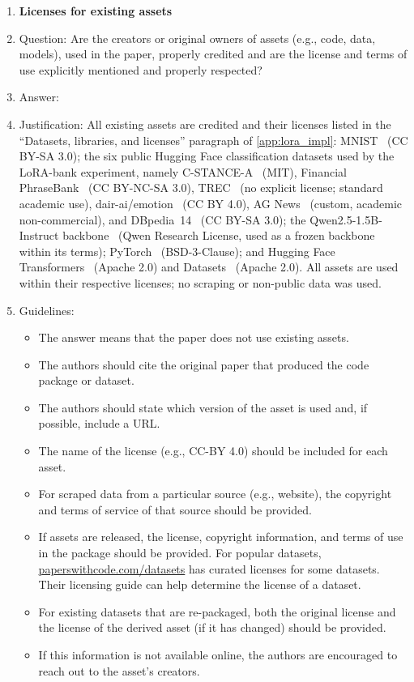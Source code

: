 \begin{enumerate}
\item {\bf Licenses for existing assets}
    \item[] Question: Are the creators or original owners of assets (e.g., code, data, models), used in the paper, properly credited and are the license and terms of use explicitly mentioned and properly respected?
    \item[] Answer: \answerYes{}
    \item[] Justification: All existing assets are credited and their licenses listed in the ``Datasets, libraries, and licenses'' paragraph of \cref{app:lora_impl}: MNIST~\citep{lecun1998mnist} (CC BY-SA 3.0); the six public Hugging Face classification datasets used by the LoRA-bank experiment, namely C-STANCE-A~\citep{zhao2024cstance} (MIT), Financial PhraseBank~\citep{malo2014finphrasebank} (CC BY-NC-SA 3.0), TREC~\citep{li2002trec} (no explicit license; standard academic use), dair-ai/emotion~\citep{saravia2018emotion} (CC BY 4.0), AG News~\citep{zhang2015charcnn} (custom, academic non-commercial), and DBpedia~14~\citep{zhang2015charcnn} (CC BY-SA 3.0); the Qwen2.5-1.5B-Instruct backbone~\citep{qwen2_5_2024} (Qwen Research License, used as a frozen backbone within its terms); PyTorch~\citep{paszke2019pytorch} (BSD-3-Clause); and Hugging Face Transformers~\citep{wolf2020transformers} (Apache 2.0) and Datasets~\citep{lhoest2021datasets} (Apache 2.0). All assets are used within their respective licenses; no scraping or non-public data was used.
    \item[] Guidelines:
    \begin{itemize}
        \item The answer \answerNA{} means that the paper does not use existing assets.
        \item The authors should cite the original paper that produced the code package or dataset.
        \item The authors should state which version of the asset is used and, if possible, include a URL.
        \item The name of the license (e.g., CC-BY 4.0) should be included for each asset.
        \item For scraped data from a particular source (e.g., website), the copyright and terms of service of that source should be provided.
        \item If assets are released, the license, copyright information, and terms of use in the package should be provided. For popular datasets, \url{paperswithcode.com/datasets} has curated licenses for some datasets. Their licensing guide can help determine the license of a dataset.
        \item For existing datasets that are re-packaged, both the original license and the license of the derived asset (if it has changed) should be provided.
        \item If this information is not available online, the authors are encouraged to reach out to the asset's creators.
    \end{itemize}


\end{enumerate}
